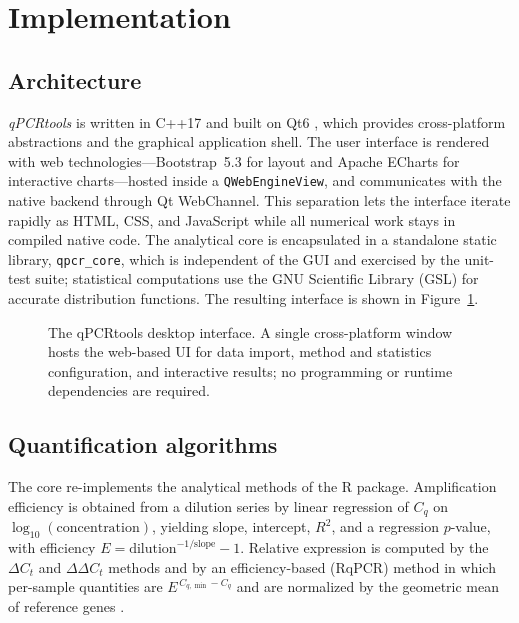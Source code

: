 \section{Implementation}

\subsection{Architecture}

\textit{qPCRtools} is written in C++17 and built on Qt6 \cite{qt}, which
provides cross-platform abstractions and the graphical application shell.
The user interface is rendered with web technologies---Bootstrap~5.3 for
layout and Apache ECharts \cite{echarts} for interactive charts---hosted
inside a \texttt{QWebEngineView}, and communicates with the native backend
through Qt WebChannel. This separation lets the interface iterate rapidly
as HTML, CSS, and JavaScript while all numerical work stays in compiled
native code. The analytical core is encapsulated in a standalone static
library, \texttt{qpcr\_core}, which is independent of the GUI and exercised
by the unit-test suite; statistical computations use the GNU Scientific
Library (GSL) for accurate distribution functions. The resulting interface is
shown in Figure~\ref{fig:overview}.

\begin{figure}[h]
\centering
\caption{The qPCRtools desktop interface. A single cross-platform window hosts
the web-based UI for data import, method and statistics configuration, and
interactive results; no programming or runtime dependencies are required.}
\label{fig:overview}
\end{figure}

\subsection{Quantification algorithms}

The core re-implements the analytical methods of the R package. Amplification
efficiency is obtained from a dilution series by linear regression of $C_q$
on $\log_{10}(\text{concentration})$, yielding slope, intercept, $R^2$, and a
regression $p$-value, with efficiency
$E = \text{dilution}^{-1/\text{slope}} - 1$. Relative expression is computed
by the $\Delta C_t$ and $\Delta\Delta C_t$ methods \cite{livak2001analysis}
and by an efficiency-based (RqPCR) method in which per-sample quantities are
$E^{\,C_{q,\min} - C_q}$ and are normalized by the geometric mean of
reference genes \cite{pfaffl2001new,rancurel2019satqpcr}.


